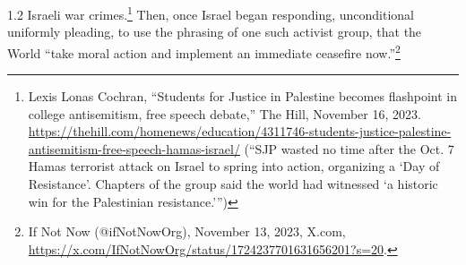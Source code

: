 \documentclass[../unravbook.tex]{subfiles}
\begin{document}
\begin{spacing}{1.2}
Israeli war crimes.\footnote{Lexis Lonas Cochran, \enquote{Students for Justice in Palestine becomes flashpoint in college antisemitism, free speech debate,} The Hill, November 16, 2023. \url{https://thehill.com/homenews/education/4311746-students-justice-palestine-antisemitism-free-speech-hamas-israel/} (\enquote{SJP wasted no time after the Oct. 7 Hamas terrorist attack on Israel to spring into action, organizing a \enquote*{Day of Resistance}. Chapters of the group said the world had witnessed \enquote*{a historic win for the Palestinian resistance.}})} Then, once Israel began responding, unconditional uniformly pleading, to use the phrasing of one such activist group, that the World \enquote{take moral action and implement an immediate ceasefire now.}\footnote{If Not Now (@ifNotNowOrg), November 13, 2023, X.com, \url{https://x.com/IfNotNowOrg/status/1724237701631656201?s=20}.}


\end{spacing}
\end{document}
